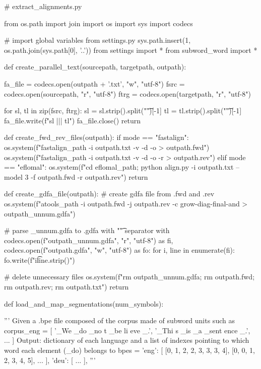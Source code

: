 \begin{python}
# extract_alignments.py

from os.path import join
import os
import sys
import codecs

# import global variables from settings.py
sys.path.insert(1, os.path.join(sys.path[0], '..'))
from settings import *
from subword_word import *

def create_parallel_text(sourcepath, targetpath, outpath):

  fa_file = codecs.open(outpath + '.txt', "w", "utf-8")
  fsrc = codecs.open(sourcepath, "r", "utf-8")
  ftrg = codecs.open(targetpath, "r", "utf-8")

  for sl, tl in zip(fsrc, ftrg):
    sl = sl.strip().split("\t")[-1]
    tl = tl.strip().split("\t")[-1]
    fa_file.write(f"{sl} ||| {tl}\n")
  fa_file.close()
  return

def create_fwd_rev_files(outpath):
  if mode == "fastalign":
    os.system(f"{fastalign_path} -i {outpath}.txt -v -d -o > {outpath}.fwd")
    os.system(f"{fastalign_path} -i {outpath}.txt -v -d -o -r > {outpath}.rev")
  elif mode == "eflomal":
    os.system(f"cd {eflomal_path}; python align.py -i {outpath}.txt --model 3 -f {outpath}.fwd -r {outpath}.rev")
  return

def create_gdfa_file(outpath):
  # create gdfa file from .fwd and .rev
  os.system(f"{atools_path} -i {outpath}.fwd -j {outpath}.rev -c grow-diag-final-and > {outpath}_unnum.gdfa")

  # parse _unnum.gdfa to .gdfa with "\t" separator
  with codecs.open(f"{outpath}_unnum.gdfa", "r", "utf-8") as fi, codecs.open(f"{outpath}.gdfa", "w", "utf-8") as fo:
    for i, line in enumerate(fi):
      fo.write(f"{i}\t{line.strip()}\n")

  # delete unnecessary files
  os.system(f"rm {outpath}_unnum.gdfa; rm {outpath}.fwd; rm {outpath}.rev; rm {outpath}.txt")
  return

def load_and_map_segmentations(num_symbols):

    '''
    Given a .bpe file composed of the corpus made of subword units such as
    corpus_eng =  [
        '_We _do _no t _be li eve _.',
        '_Thi s _is _a _sent ence _.',
        ...
    ]
    Output: dictionary of each language and 
    a list of indexes pointing to which word each element (_do) belongs to
    bpes = {
        'eng':
        [
            [0, 1, 2, 2, 3, 3, 3, 4],
            [0, 0, 1, 2, 3, 4, 5],
            ...
        ],
        'deu':
        [
            ...
        ],
    } 
    '''


\end{python}
